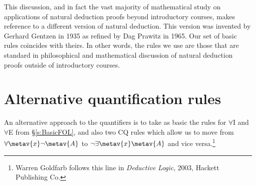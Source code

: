 This discussion, and in fact the vast majority of mathematical study on applications of natural deduction proofs beyond introductory courses, makes reference to a different version of natural deduction. This version was invented by Gerhard Gentzen in 1935 as refined by Dag Prawitz in 1965. Our set of basic rules coincides with theirs. In other words, the rules we use are those that are standard in philosophical and mathematical discussion of natural deduction proofs outside of introductory courses.



\section{Alternative quantification rules}
An alternative approach to the quantifiers is to take as basic the rules for $\forall$I and $\forall$E from \S\ref{s:BasicFOL}, and also two CQ rules which allow us to move from $\forall \metav{x} \enot \metav{A}$ to $\enot \exists \metav{x} \metav{A}$ and vice versa.\footnote{Warren Goldfarb follows this line in \textit{Deductive Logic}, 2003, Hackett Publishing Co.}  

